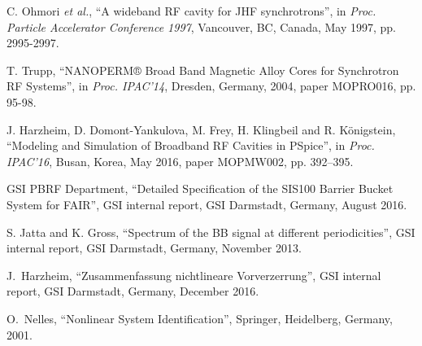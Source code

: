 \documentclass[a4paper,
               keeplastbox,%
               nospread%
              ]{jacow}
\begin{document}
\begin{thebibliography}{99}
	
	
	
	
	
	C. Ohmori \textit{et al.}, “A wideband RF cavity for JHF synchrotrons”, 
	in \textit{Proc. Particle Accelerator Conference 1997}, Vancouver, BC, Canada, May 1997, pp. 2995-2997.

	T. Trupp, “NANOPERM® Broad Band Magnetic Alloy Cores for Synchrotron RF Systems”,
	in \textit{Proc. IPAC'14}, Dresden, Germany, 2004, paper MOPRO016, pp. 95-98.	
	
	J. Harzheim, D. Domont-Yankulova, M. Frey, H. Klingbeil and R. Königstein,
	“Modeling and Simulation of Broadband RF Cavities in PSpice”,
	in \textit{Proc. IPAC’16},
	Busan, Korea, May 2016, 
	paper MOPMW002, pp. 392--395.	
	
	GSI PBRF Department, “Detailed Specification of the SIS100 Barrier Bucket System for FAIR”,
	GSI internal report, GSI Darmstadt, Germany, August 2016.
   
	
	S. Jatta and K. Gross, “Spectrum of the BB signal at different periodicities”,
	GSI internal report, GSI Darmstadt, Germany, November 2013. %
	
	J.~Harzheim, “Zusammenfassung nichtlineare Vorverzerrung”,
	GSI internal report, GSI Darmstadt, Germany, December 2016.
	
	O.~Nelles, “Nonlinear System Identification”,
	Springer, Heidelberg, Germany, 2001.
	

\end{thebibliography}
\end{document}
